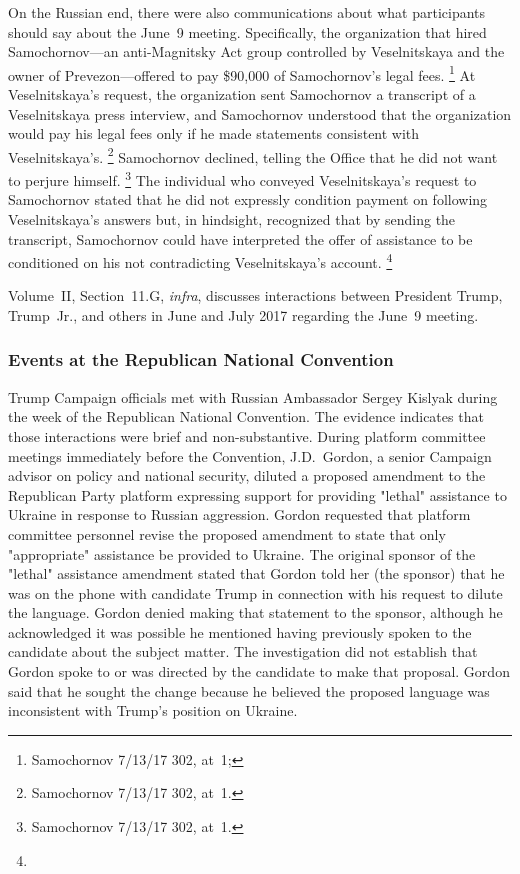 On the Russian end, there were also communications about what participants should say about the June~9 meeting.
Specifically, the organization that hired Samochornov---an anti-Magnitsky Act group controlled by Veselnitskaya and the owner of Prevezon---offered to pay \$90,000 of Samochornov's legal fees.%
\footnote{Samochornov 7/13/17 302, at~1; }
At Veselnitskaya's request, the organization sent Samochornov a transcript of a Veselnitskaya press interview, and Samochornov understood that the organization would pay his legal fees only if he made statements consistent with Veselnitskaya's.%
\footnote{ Samochornov 7/13/17 302, at~1.}
Samochornov declined, telling the Office that he did not want to perjure himself.%
\footnote{Samochornov 7/13/17 302, at~1.}
The individual who conveyed Veselnitskaya's request to Samochornov stated that he did not expressly condition payment on following Veselnitskaya's answers but, in hindsight, recognized that by sending the transcript, Samochornov could have interpreted the offer of assistance to be conditioned on his not contradicting Veselnitskaya's account.%
\footnote{}

Volume~II, Section~11.G, \textit{infra}, discusses interactions between President Trump, Trump~Jr., and others in June and July 2017 regarding the June~9 meeting.

\subsubsection{Events at the Republican National Convention}

Trump Campaign officials met with Russian Ambassador Sergey Kislyak during the week of the Republican National Convention.
The evidence indicates that those interactions were brief and non-substantive.
During platform committee meetings immediately before the Convention, J.D.~Gordon, a senior Campaign advisor on policy and national security, diluted a proposed amendment to the Republican Party platform expressing support for providing "lethal" assistance to Ukraine in response to Russian aggression.
Gordon requested that platform committee personnel revise the proposed amendment to state that only "appropriate" assistance be provided to Ukraine.
The original sponsor of the "lethal" assistance amendment stated that Gordon told her (the sponsor) that he was on the phone with candidate Trump in connection with his request to dilute the language.
Gordon denied making that statement to the sponsor, although he acknowledged it was possible he mentioned having previously spoken to the candidate about the subject matter.
The investigation did not establish that Gordon spoke to or was directed by the candidate to make that proposal.
Gordon said that he sought the change because he believed the proposed language was inconsistent with Trump's position on Ukraine.

